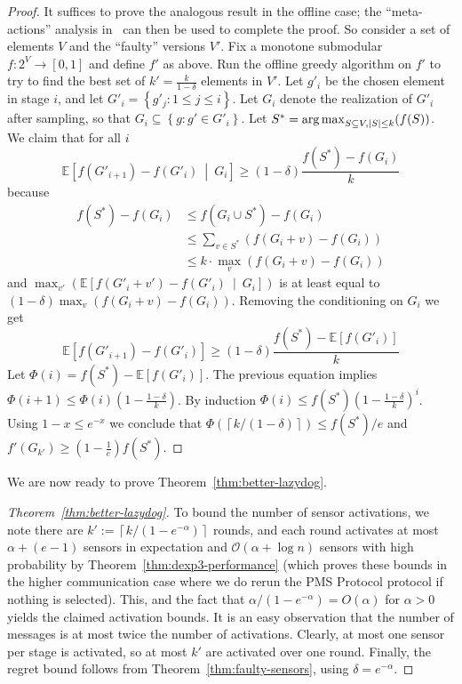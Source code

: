 \documentclass{sig-alternate-dan}
\numberwithin{equation}{section}
\newcommand{\cO}{\mathcal{O}}
\newcommand{\sensor}{\ensuremath{v}}
\newcommand{\sensors}{V}
\newcommand{\K}{\ensuremath{k}}
\newcommand{\LimitProtocolShort}[0]{PMS Protocol\xspace}
\def \argmax {\mathop{\rm arg\,max}}
\newcommand{\paren} [1] {\ensuremath{ \left( {#1} \right) }}
\newcommand{\set}[1]{\ensuremath{\left\{#1\right\}}}
\newcommand{\E}[1]{\ensuremath{\mathbb{E}\left[#1\right] }}
\newcommand{\Econd}[2]{\ensuremath{\mathbb{E}\left[  {#1} \ \middle| \ {#2}\right] }}  %
\newcommand{\ceil}[1]{\ensuremath{\left\lceil#1\right\rceil}}
\begin{document}
{\begin{proof}
It suffices to prove the analogous result in the offline case; the
``meta-actions'' analysis in~\cite{streeter07tr} can then be used to complete the proof.
So consider a set of elements $\sensors$ and the ``faulty'' versions
$\sensors'$.  Fix a monotone submodular $f:2^{\sensors} \to [0,1]$ and
define $f'$ as above.  Run the offline greedy algorithm on $f'$ to try
to find the best set of $\K' = \frac{\K}{1-\delta}$ elements in $\sensors'$.
Let $g'_i$ be the chosen element in stage $i$, and let $G'_i = \set{g'_j : 1
  \le j \le i}$.  Let $G_i$ denote the realization of $G'_i$ after
sampling, so that $G_i \subseteq \set{g : g' \in G'_i}$.
Let  $S^* = \argmax_{S \subseteq \sensors, |S| \le \K}(f(S))$.
%
We claim that for all $i$
\[
\Econd{f(G'_{i+1}) - f(G'_i)}{G_i} \ge \paren{1-\delta}
\frac{f(S^*) - f(G_i)}{\K}
\]
because 
\begin{align*}
f(S^*) - f(G_i) & \le f(G_i \cup S^*) - f(G_i)\\
                & \le \sum_{\sensor \in S^*} \paren{f(G_i + \sensor) - f(G_i)}\\
                & \le \K \cdot \max_{\sensor} \paren{f(G_i + \sensor) - f(G_i)}
\end{align*}
and $\max_{\sensor'} \paren{\Econd{f(G'_i + \sensor') - f(G'_i)}{G_i} }$ is at least equal to 
$(1-\delta)\max_{\sensor} \paren{f(G_i + \sensor) - f(G_i)}$.
Removing the conditioning on $G_i$ we get 
\[
\E{f(G'_{i+1}) - f(G'_i)} \ge \paren{1-\delta}\frac{f(S^*) -
  \E{f(G'_i)}}{\K}
\]
Let $\Phi(i) = f(S^*) - \E{f(G'_{i})}$.  The previous equation implies 
$\Phi(i+1) \le \Phi(i)\paren{1 - \frac{1-\delta}{\K}}$.
By induction $\Phi(i) \le f(S^*)\paren{1 - \frac{1-\delta}{\K}}^i$.
Using $1-x \le e^{-x}$ we conclude that $\Phi(\ceil{\K/(1-\delta)})
\le f(S^*)/e$ and $f'(G_{\K'}) \ge \paren{1-\frac{1}{e}}f(S^*)$.
\end{proof}

\noindent
We are now ready to prove Theorem~\ref{thm:better-lazydog}.

\begin{proof}[Theorem~\ref{thm:better-lazydog}]
To bound the number of sensor activations, we note there are 
 $\K' := \ceil{\K/(1 - e^{-\alpha})}$ rounds, and each round activates  
at most $\alpha + (e-1)$ sensors in expectation and $\cO(\alpha + \log
n)$ sensors with high probability by
Theorem~\ref{thm:dexp3-performance} (which proves these bounds in the
higher communication case where we do rerun the \LimitProtocolShort protocol if nothing is
selected).  This, and the fact that $\alpha/(1 - e^{-\alpha}) =
O(\alpha)$ for $\alpha > 0$ yields the claimed activation bounds.
It is an easy observation that the number of messages is at most twice
the number of activations.  Clearly, at most one sensor per stage is
activated, so at most $\K'$ are activated over one round.
Finally, the regret bound follows from
Theorem~\ref{thm:faulty-sensors}, using $\delta = e^{-\alpha}$.
\end{proof}

%


%
%
%
}{ }
%




%
%
%
%
%
%


%
\end{document}
